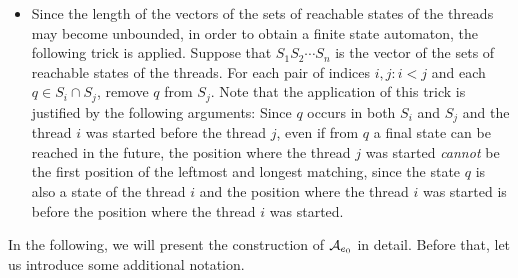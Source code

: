 \begin{itemize}
%
%
	\item Since the length of the vectors of the sets of reachable states of the threads may become unbounded, in order to obtain a finite state automaton, the following trick is applied. 
    Suppose that $S_1 S_2 \cdots S_n$ is the vector of the sets of reachable states of the threads. 
    For each pair of indices $i, j: i < j$ and each $q \in S_i \cap S_j$, remove $q$ from $S_j$. 
    Note that the application of this trick is justified by the following arguments: Since $q$ occurs in both $S_i$ and $S_j$ and the thread $i$ was started before the thread $j$, even if from $q$  a final state can be reached in the future, the position where the thread $j$ was started \emph{cannot} be the first position of the leftmost and longest matching, since the state $q$ is also a state of the thread $i$ and the position where the thread $i$ was started is before the position where the thread $i$ was started.
\end{itemize}

In the following, we will present the construction of $\mathcal{A}_{e_0}$ in detail. Before that, let us introduce some additional notation.

